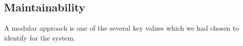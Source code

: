 \documentclass[../../../rasd.tex]{subfiles}
\begin{document}
\subsection{Maintainability\label{sect:3.5.4}}

A modular approach is one of the several key values which we had chosen to identify for the system.
\end{document}
